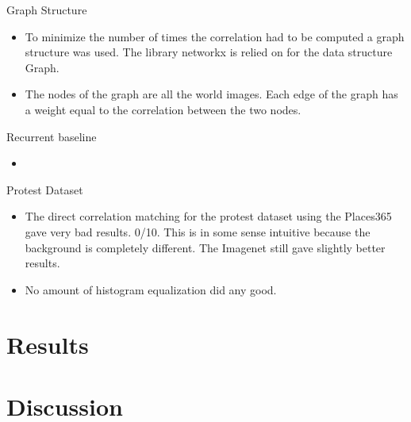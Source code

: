 \documentclass{article}
\begin{document}
Graph Structure
\begin{itemize}
\item To minimize the number of times the correlation had to be computed a graph structure was used. The library networkx is relied on for the data structure Graph.
\item The nodes of the graph are all the world images. Each edge of the graph has a weight equal to the correlation between the two nodes.
\end{itemize}

Recurrent baseline
\begin{itemize}
\item
\end{itemize}

Protest Dataset
\begin{itemize}
\item The direct correlation matching for the protest dataset using the Places365 gave very bad results. 0/10. This is in some sense intuitive because the background is completely different. The Imagenet still gave slightly better results.
\item No amount of histogram equalization did any good.
\end{itemize}
\section{Results}
\section{Discussion}
\end{document}

